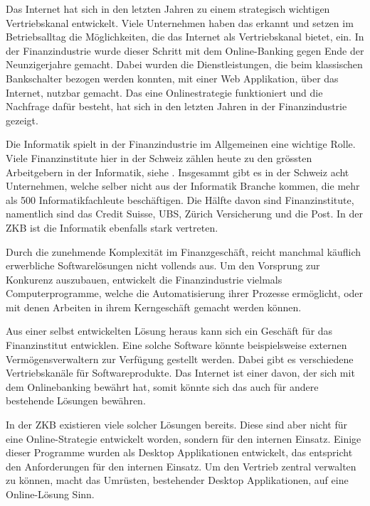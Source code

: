   Das Internet hat sich in den letzten Jahren zu einem strategisch wichtigen
  Vertriebskanal entwickelt. Viele Unternehmen haben das erkannt und setzen im
  Betriebsalltag die Möglichkeiten, die das Internet als Vertriebskanal bietet,
  ein. In der Finanzindustrie wurde dieser Schritt mit dem Online-Banking gegen
  Ende der Neunzigerjahre gemacht. Dabei wurden die Dienstleistungen, die beim
  klassischen Bankschalter bezogen werden konnten, mit einer Web Applikation,
  über das Internet, nutzbar gemacht. Das eine Onlinestrategie funktioniert und
  die Nachfrage dafür besteht, hat sich in den letzten Jahren in der
  Finanzindustrie gezeigt.
  
  Die Informatik spielt in der Finanzindustrie im Allgemeinen eine wichtige
  Rolle. Viele Finanzinstitute hier in der Schweiz zählen heute zu den grössten
  Arbeitgebern in der Informatik, siehe \cite{WoArbeitenInformatikfachleute}.
  Insgesammt gibt es in der Schweiz acht Unternehmen, welche selber nicht aus
  der Informatik Branche kommen, die mehr als 500 Informatikfachleute
  beschäftigen. Die Hälfte davon sind Finanzinstitute, namentlich sind das
  Credit Suisse, UBS, Zürich Versicherung und die Post. In der \ac{ZKB} ist die
  Informatik ebenfalls stark vertreten.
  
  Durch die zunehmende Komplexität im Finanzgeschäft, reicht manchmal käuflich
  erwerbliche Softwarelösungen nicht vollends aus. Um den Vorsprung zur
  Konkurenz auszubauen, entwickelt die Finanzindustrie vielmals
  Computerprogramme, welche die Automatisierung ihrer Prozesse ermöglicht,
  oder mit denen Arbeiten in ihrem Kerngeschäft gemacht werden können.
  
  Aus einer selbst entwickelten Lösung heraus kann sich ein Geschäft für das
  Finanzinstitut entwicklen. Eine solche Software könnte beispielsweise externen
  Vermögensverwaltern zur Verfügung gestellt werden. Dabei gibt es verschiedene
  Vertriebskanäle für Softwareprodukte. Das Internet ist einer davon, der sich
  mit dem Onlinebanking bewährt hat, somit könnte sich das auch für
  andere bestehende Lösungen bewähren.
  
  In der \ac{ZKB} existieren viele solcher Lösungen bereits. Diese sind
  aber nicht für eine Online-Strategie entwickelt worden, sondern für den
  internen Einsatz. Einige dieser Programme wurden als Desktop Applikationen
  entwickelt, das entspricht den Anforderungen für den internen Einsatz. Um den
  Vertrieb zentral verwalten zu können, macht das Umrüsten, bestehender Desktop
  Applikationen, auf eine Online-Lösung Sinn.
  
